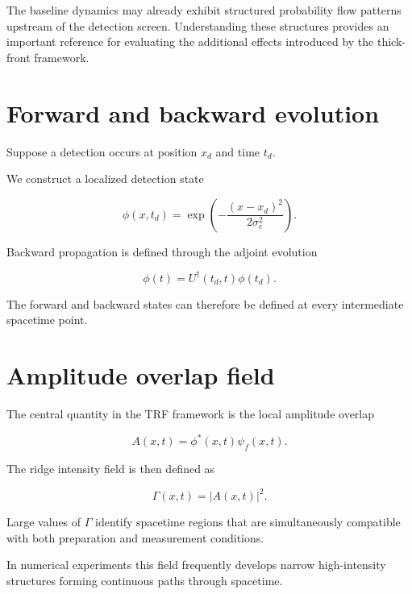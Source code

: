\documentclass[aps,prl,reprint]{revtex4-2}
\begin{document}
The baseline dynamics may already exhibit structured probability
flow patterns upstream of the detection screen.
Understanding these structures provides an important reference
for evaluating the additional effects introduced by the
thick-front framework.



\section{Forward and backward evolution}

Suppose a detection occurs at position $x_d$ and time $t_d$.

We construct a localized detection state

\begin{equation}
\phi(x,t_d) =
\exp\!\left(
-\frac{(x-x_d)^2}{2\sigma_c^2}
\right).
\end{equation}

Backward propagation is defined through the adjoint evolution

\begin{equation}
\phi(t) = U^\dagger(t_d,t)\phi(t_d).
\end{equation}

The forward and backward states can therefore be defined at
every intermediate spacetime point.



\section{Amplitude overlap field}

The central quantity in the TRF framework is the local amplitude
overlap

\begin{equation}
A(x,t) = \phi^*(x,t)\psi_f(x,t).
\end{equation}

The ridge intensity field is then defined as

\begin{equation}
\Gamma(x,t) = |A(x,t)|^2 .
\end{equation}

Large values of $\Gamma$ identify spacetime regions that are
simultaneously compatible with both preparation and measurement
conditions.

In numerical experiments this field frequently develops narrow
high-intensity structures forming continuous paths through
spacetime.
\end{document}
